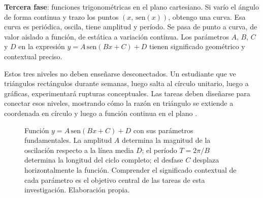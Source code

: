 \textbf{Tercera fase}: funciones trigonométricas en el plano cartesiano. Si varío el ángulo de forma continua y trazo los puntos $(x,\, \mathrm{sen}(x))$, obtengo una curva. Esa curva es periódica, oscila, tiene amplitud y período. Se pasa de punto a curva, de valor aislado a función, de estática a variación continua. Los parámetros $A$, $B$, $C$ y $D$ en la expresión $y = A\,\mathrm{sen}(Bx + C) + D$ tienen significado geométrico y contextual preciso.

Estos tres niveles no deben enseñarse desconectados. Un estudiante que ve triángulos rectángulos durante semanas, luego salta al círculo unitario, luego a gráficas, experimentará rupturas conceptuales. Las tareas deben diseñarse para conectar esos niveles, mostrando cómo la razón en triángulo se extiende a coordenada en círculo y luego a función continua en el plano \parencite{montiel-espinosaDesarrolloPensamientoTrigonometrico2013}.

\begin{figure}[H]
\centering
{}
\caption{Función $y = A\,\mathrm{sen}(Bx + C) + D$ con sus parámetros fundamentales.
La amplitud $A$ determina la magnitud de la oscilación respecto a la línea media $D$;
el período $T = 2\pi/B$ determina la longitud del ciclo completo;
el desfase $C$ desplaza horizontalmente la función.
Comprender el significado contextual de cada parámetro es el objetivo central
de las tareas de esta investigación. Elaboración propia.}
\label{fig:funcion_seno}
\end{figure}


